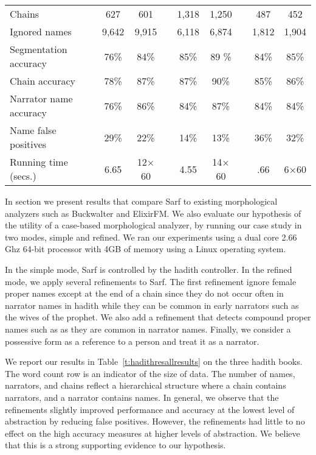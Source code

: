 \documentclass[11pt]{article}
\begin{document}
\begin{table*}[bt]
\begin{tabular}{lp{.2cm}ccp{.2cm}ccp{.2cm}cc}
Chains & & 627 & 601 &  & 1,318 & 1,250 & & 487 & 452 \\ 
Ignored names & & 9,642 & 9,915 &  & 6,118 & 6,874 & & 1,812 & 1,904 \\ \hline
Segmentation accuracy & & 76\%& 84\%& & 85\%& 89 \%& & 84\%& 85\%\\ 
Chain accuracy & & 78\% & 87\%&  & 87\%& 90\%& & 85\% & 86\% \\ 
Narrator name accuracy & & 76\% & 86\%& & 84\%& 87\% & & 84\% & 84\% \\ \hline
Name false positives & & 29\% & 22\%&  & 14\%& 13\% & & 36\% & 32\% \\ \hline
Running time (secs.)& & 6.65 & 12$\times$60& &4.55 & 14$\times$60 & & .66 & 6$\times$60 
\end{tabular}
\normalsize
\label{t:hadithresallresults}
\end{table*}

In section we present results that compare Sarf to existing 
morphological analyzers such as Buckwalter and ElixirFM. 
We also evaluate our hypothesis of the utility of a case-based 
morphological analyzer,
by running our case study in two modes, simple and refined.
We ran our experiments using a dual core 2.66 Ghz 64-bit processor 
with 4GB of memory using a Linux operating system. 

In the simple mode, Sarf is controlled by the hadith controller.
In the refined mode, we apply several refinements to Sarf.
The first refinement ignore female proper names except at the end of
a chain since they do not occur often in narrator names in hadith while
they can be common in early narrators such as the wives of the prophet.
We also add a refinement that detects compound proper names 
such as  
as they are common in narrator names.
Finally, we consider a possessive form as a reference to a person and treat
it as a narrator.

We report our results in Table~\ref{t:hadithresallresults} on the three hadith books.
The word count row is an indicator of the size of data.
The number of names, narrators, and chains reflect a hierarchical structure where a chain contains
narrators, and a narrator contains names.
In general, we observe that the refinements slightly improved performance and accuracy at
the lowest level of abstraction by reducing false positives.
However, the refinements had little to no effect on the high accuracy measures at higher
levels of abstraction.
We believe that this is a strong supporting evidence to our hypothesis.
\end{document}
